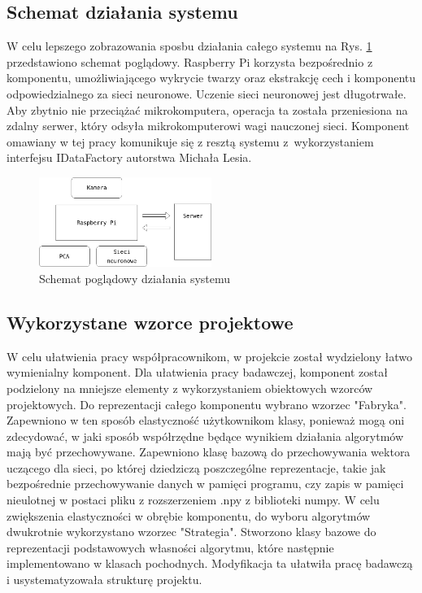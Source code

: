\documentclass[oneside, eng]{mgr}
\begin{document}
\subsection{Schemat działania systemu}

W celu lepszego zobrazowania sposbu działania całego systemu na Rys. \ref{fig:schemat_pogl} przedstawiono schemat poglądowy. Raspberry Pi korzysta bezpośrednio z komponentu, umożliwiającego wykrycie twarzy oraz ekstrakcję cech i komponentu odpowiedzialnego za sieci neuronowe. Uczenie sieci neuronowej jest długotrwałe. Aby zbytnio nie przeciążać mikrokomputera, operacja ta została przeniesiona na zdalny serwer, który odsyła mikrokomputerowi wagi nauczonej sieci. Komponent omawiany w tej pracy komunikuje się z resztą systemu z~wykorzystaniem interfejsu IDataFactory autorstwa Michała Lesia.

\begin{figure}
\centering
	\includegraphics[width=0.50\textwidth,natwidth=610,natheight=642]{schemat_pogladowy.jpg}\par\vspace{0.5cm}
\caption{Schemat poglądowy działania systemu}
	\label{fig:schemat_pogl}
\end{figure}



\subsection{Wykorzystane wzorce projektowe}

W celu ułatwienia pracy współpracownikom, w projekcie został wydzielony łatwo wymienialny komponent. Dla ułatwienia pracy badawczej, komponent został podzielony na mniejsze elementy z wykorzystaniem obiektowych wzorców projektowych.
Do reprezentacji całego komponentu wybrano wzorzec "Fabryka". Zapewniono w ten sposób elastyczność użytkownikom klasy, ponieważ mogą oni zdecydować, w jaki sposób współrzędne będące wynikiem działania algorytmów mają być przechowywane. Zapewniono klasę bazową do przechowywania wektora uczącego dla sieci, po której dziedziczą poszczególne reprezentacje, takie jak bezpośrednie przechowywanie danych w pamięci programu, czy zapis w pamięci nieulotnej w postaci pliku z rozszerzeniem .npy z biblioteki numpy.
W celu zwiększenia elastyczności w obrębie komponentu, do wyboru algorytmów dwukrotnie wykorzystano wzorzec "Strategia". Stworzono klasy bazowe do reprezentacji podstawowych własności algorytmu, które następnie implementowano w klasach pochodnych. Modyfikacja ta ułatwiła pracę badawczą i usystematyzowała strukturę projektu.
\end{document}
